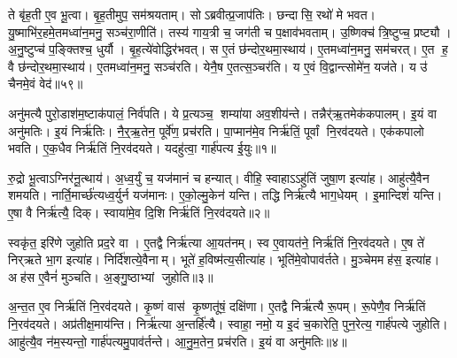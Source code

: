 ते बृ॑ह॒ती ए॒व भू॒त्वा।
बृ॒ह॒तीमुप॒ सम॑श्रयताम्।
सोऽब्रवीत्प्र॒जाप॑तिः।
छन्दासि॒ रथो॑ मे भवत।
यु॒ष्माभि॑र॒हमे॒तमध्वा॑न॒मनु॒ सञ्च॑रा॒णीति॑।
तस्य॑ गाय॒त्री च॒ जग॑ती च प॒क्षाव॑भवताम्।
उ॒ष्णिक्च॑ त्रि॒ष्टुप्च॒ प्रष्ट्यौ।
अ॒नु॒ष्टुप्च॑ प॒ङ्क्तिश्च॒ धुर्यौ।
बृ॒ह॒त्ये॑वोद्धिर॑भवत्।
स ए॒तं छ॑न्दोर॒थमा॒स्थाय॑।
ए॒तमध्वा॑न॒मनु॒ सम॑चरत्।
ए॒त ह॒ वै छ॑न्दोर॒थमा॒स्थाय॑।
ए॒तमध्वा॑न॒मनु॒ सञ्च॑रति।
येनै॒ष ए॒तत्स॒ञ्चर॑ति।
य ए॒वं वि॒द्वान्त्सोमे॑न॒ यज॑ते।
य उ॑ चैनमे॒वं वेद॑॥५९॥\anuvakamend[अ॒भ॒व॒न्वाव सा दे॒वाक्ष॑रा बृह॒त्य॑दधा॒द्द्वाद॑शा॒क्षराण्यप॒च्छिद्या॑दधादा॒स्थाय॒ षट्च॑]






\clearpage
{}
\setcounter{anuvakam}{0}

अनु॑मत्यै पुरो॒डाश॑म॒ष्टाक॑पालं॒ निर्व॑पति।
ये प्र॒त्यञ्च॒ शम्या॑या अव॒शीय॑न्ते।
तन्नैर्॑ऋ॒तमेक॑कपालम्।
इ॒यं वा अनु॑मतिः।
इ॒यं निर्\mbox{}ऋ॑तिः।
नै॒र्॒ऋ॒तेन॒ पूर्वे॑ण॒ प्रच॑रति।
पा॒प्मान॑मे॒व निर्\mbox{}ऋ॑तिं॒ पूर्वां नि॒रव॑दयते।
एक॑कपालो भवति।
ए॒क॒धैव निर्\mbox{}ऋ॑तिं नि॒रव॑दयते।
यदहु॑त्वा॒ गार्\mbox{}ह॑पत्य ई॒युः॥१॥

रु॒द्रो भू॒त्वाऽग्निर॑नू॒त्थाय॑।
अ॒ध्व॒र्युं च॒ यज॑मानं च हन्यात्।
वीहि॒ स्वाहाऽऽहु॑तिं जुषा॒ण इत्या॑ह।
आहु॑त्यै॒वैन शमयति।
नार्ति॒मार्च्छ॑त्यध्व॒र्युर्न यज॑मानः।
ए॒को॒ल्मु॒केन॑ यन्ति।
तद्धि निर्\mbox{}ऋ॑त्यै भाग॒धेयम्।
इ॒मान्दिशं॑ यन्ति।
ए॒षा वै निर्\mbox{}ऋ॑त्यै॒ दिक्।
स्वाया॑मे॒व दि॒शि निर्\mbox{}ऋ॑तिं नि॒रव॑दयते॥२॥

स्वकृ॑त॒ इरि॑णे जुहोति प्रद॒रे वा।
ए॒तद्वै निर्\mbox{}ऋ॑त्या आ॒यत॑नम्।
स्व ए॒वायत॑ने॒ निर्\mbox{}ऋ॑तिं नि॒रव॑दयते।
ए॒ष ते॑ निर्‌ऋते भा॒ग इत्या॑ह।
निर्दि॑शत्ये॒वैनाम्।
भूते॑ ह॒विष्म॑त्य॒सीत्या॑ह।
भूति॑मे॒वोपाव॑र्तते।
मु॒ञ्चेममह॑स॒ इत्या॑ह।
अह॑स ए॒वैनं॑ मुञ्चति।
अ॒ङ्गु॒ष्ठाभ्यां जुहोति॥३॥

अ॒न्त॒त ए॒व निर्\mbox{}ऋ॑तिं नि॒रव॑दयते।
कृ॒ष्णं वास॑ कृ॒ष्णतू॑षं॒ दक्षि॑णा।
ए॒तद्वै निर्\mbox{}ऋ॑त्यै रू॒पम्।
रू॒पेणै॒व निर्\mbox{}ऋ॑तिं नि॒रव॑दयते।
अप्र॑तीक्ष॒माय॑न्ति।
निर्\mbox{}ऋ॑त्या अ॒न्तर्\mbox{}हि॑त्यै।
स्वाहा॒ नमो॒ य इ॒दं च॒कारेति॒ पुन॒रेत्य॒ गार्\mbox{}ह॑पत्ये जुहोति।
आहु॑त्यै॒व न॑म॒स्यन्तो॒ गार्\mbox{}ह॑पत्यमु॒पाव॑र्तन्ते।
आ॒नु॒म॒तेन॒ प्रच॑रति।
इ॒यं वा अनु॑मतिः॥४॥

